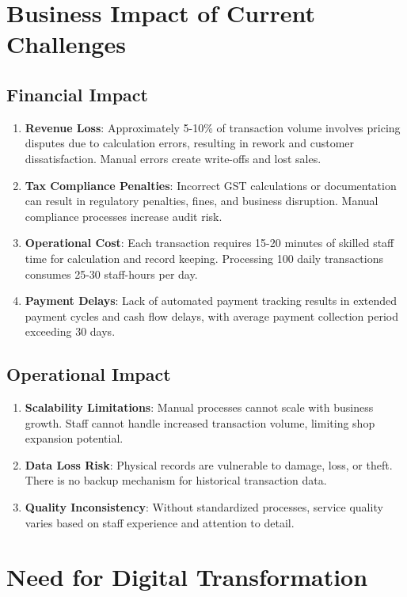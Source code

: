 \documentclass[12pt,a4paper]{report}
\begin{document}
\section{Business Impact of Current Challenges}

\subsection{Financial Impact}
\begin{enumerate}[label=\roman*)]
    \item \textbf{Revenue Loss}: Approximately 5-10\% of transaction volume involves pricing disputes due to calculation errors, resulting in rework and customer dissatisfaction. Manual errors create write-offs and lost sales.
    \item \textbf{Tax Compliance Penalties}: Incorrect GST calculations or documentation can result in regulatory penalties, fines, and business disruption. Manual compliance processes increase audit risk.
    \item \textbf{Operational Cost}: Each transaction requires 15-20 minutes of skilled staff time for calculation and record keeping. Processing 100 daily transactions consumes 25-30 staff-hours per day.
    \item \textbf{Payment Delays}: Lack of automated payment tracking results in extended payment cycles and cash flow delays, with average payment collection period exceeding 30 days.
\end{enumerate}

\subsection{Operational Impact}
\begin{enumerate}[label=\roman*)]
    \item \textbf{Scalability Limitations}: Manual processes cannot scale with business growth. Staff cannot handle increased transaction volume, limiting shop expansion potential.
    \item \textbf{Data Loss Risk}: Physical records are vulnerable to damage, loss, or theft. There is no backup mechanism for historical transaction data.
    \item \textbf{Quality Inconsistency}: Without standardized processes, service quality varies based on staff experience and attention to detail.
\end{enumerate}

\section{Need for Digital Transformation}
\end{document}
